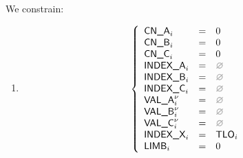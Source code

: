 \begin{center}
\end{center}

We constrain:
\begin{enumerate}
	\item 
		\[
			\left\{ \begin{array}{lclr}
				\cnA      _{i}       & = & 0            \\
				\cnB      _{i}       & = & 0            \\
				\cnC      _{i}       & = & 0            \\
				\indexA   _{i}       & = & \nothing     \\
				\indexB   _{i}       & = & \nothing     \\
				\indexC   _{i}       & = & \nothing     \\
				\valA     _{i}\new{} & = & \nothing     \\
				\valB     _{i}\new{} & = & \nothing     \\
				\valC     _{i}\new{} & = & \nothing     \\
				\indexX   _{i}       & = & \tlo_{i}     \\
				\limb     _{i}       & = & 0            \\
			\end{array} \right.
		\]
\end{enumerate}
